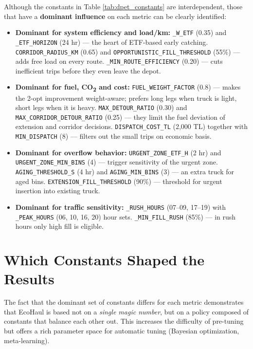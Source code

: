 \documentclass[12pt,a4paper]{report}
\begin{document}
\indent Although the constants in Table \ref{tab:dpet_constants} are interdependent, those that have a \textbf{dominant influence} on each metric can be clearly identified:

\begin{itemize}[leftmargin=*]
  \item \textbf{Dominant for system efficiency and load/km:}
    \texttt{\_W\_ETF} (0.35) and \texttt{\_ETF\_HORIZON} (24 hr) --- the heart of ETF-based early catching.
    \texttt{CORRIDOR\_RADIUS\_KM} (0.65) and \texttt{OPPORTUNISTIC\_FILL\_THRESHOLD} (55\%) --- adds free load on every route.
    \texttt{\_MIN\_ROUTE\_EFFICIENCY} (0.20) --- cuts inefficient trips before they even leave the depot.
  \item \textbf{Dominant for fuel, CO\textsubscript{2} and cost:}
    \texttt{FUEL\_WEIGHT\_FACTOR} (0.8) --- makes the 2-opt improvement weight-aware; prefers long legs when truck is light, short legs when it is heavy.
    \texttt{MAX\_DETOUR\_RATIO} (0.30) and \texttt{MAX\_CORRIDOR\_DETOUR\_RATIO} (0.25) --- they limit the fuel deviation of extension and corridor decisions.
    \texttt{DISPATCH\_COST\_TL} (2,000 TL) together with \texttt{MIN\_DISPATCH} (8) --- filters out the small trips on economic basis.
  \item \textbf{Dominant for overflow behavior:}
    \texttt{URGENT\_ZONE\_ETF\_H} (2 hr) and \texttt{URGENT\_ZONE\_MIN\_BINS} (4) --- trigger sensitivity of the urgent zone.
    \texttt{AGING\_THRESHOLD\_S} (4 hr) and \texttt{AGING\_MIN\_BINS} (3) --- an extra truck for aged bins.
    \texttt{EXTENSION\_FILL\_THRESHOLD} (90\%) --- threshold for urgent insertion into existing truck.
  \item \textbf{Dominant for traffic sensitivity:}
    \texttt{\_RUSH\_HOURS} (07--09, 17--19) with \texttt{\_PEAK\_HOURS} (06, 10, 16, 20) hour sets.
    \texttt{\_MIN\_FILL\_RUSH} (85\%) --- in rush hours only high fill is eligible.
\end{itemize}


\section{Which Constants Shaped the Results}
\label{sec:which_constants}

\indent The fact that the dominant set of constants differs for each metric demonstrates that EcoHaul is based not on a \textit{single magic number}, but on a policy composed of constants that balance each other out. This increases the difficulty of pre-tuning but offers a rich parameter space for automatic tuning (Bayesian optimization, meta-learning).
\end{document}
